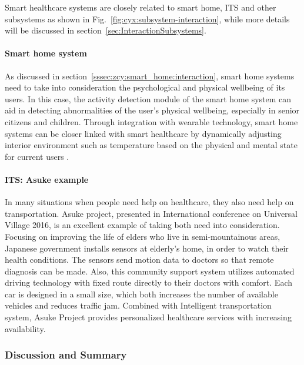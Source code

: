 \documentclass[letterpaper, twocolumn, 10pt, conference]{IEEEtran}
\begin{document}
Smart healthcare systems are closely related to smart home, ITS and other subsystems as shown in Fig.~\ref{fig:cyx:subsystem-interaction}, while more details will be discussed in section~\ref{sec:InteractionSubsystems}. 



\paragraph{Smart home system}


As discussed in section~\ref{sssec:zcy:smart_home:interaction}, smart home systems need to take into consideration the psychological and physical wellbeing of its users. In this case, the activity detection module of the smart home system can aid in detecting abnormalities of the user's physical wellbeing, especially in senior citizens and children. Through integration with wearable technology, smart home systems can be closer linked with smart healthcare by dynamically adjusting interior environment such as temperature based on the physical and mental state for current users .

\paragraph{ITS: Asuke example}

In many situations when people need help on healthcare, they also need help on transportation. Asuke project, presented in International conference on Universal Village 2016, is an excellent example of taking both need into consideration. 
Focusing on improving the life of elders who live in semi-mountainous areas, Japanese government installs sensors at elderly’s home, in order to watch their health conditions. The sensors send motion data to doctors so that remote diagnosis can be made. Also, this community support system utilizes automated driving technology with fixed route directly to their doctors with comfort. Each car is designed in a small size, which both increases the number of available vehicles and reduces traffic jam. Combined with Intelligent transportation system, Asuke Project provides personalized healthcare services with increasing availability.




\subsubsection{Discussion and Summary}
\label{sssec:cgh:smart_health:discussion}
\end{document}
